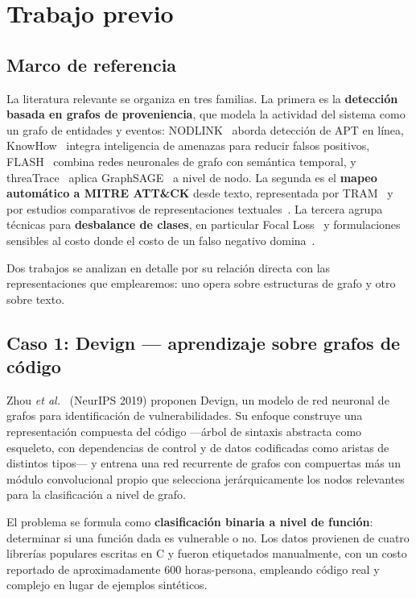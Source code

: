 \documentclass[conference]{IEEEtran}
\begin{document}
\section{Trabajo previo}
\label{sec:relacionados}

\subsection{Marco de referencia}
La literatura relevante se organiza en tres familias. La primera es la \textbf{detecci\'on basada en grafos de proveniencia}, que modela la actividad del sistema como un grafo de entidades y eventos: NODLINK~\cite{nodlink} aborda detecci\'on de APT en l\'inea, KnowHow~\cite{knowhow} integra inteligencia de amenazas para reducir falsos positivos, FLASH~\cite{flash} combina redes neuronales de grafo con sem\'antica temporal, y threaTrace~\cite{threatrace} aplica GraphSAGE~\cite{graphsage} a nivel de nodo. La segunda es el \textbf{mapeo autom\'atico a MITRE ATT\&CK} desde texto, representada por TRAM~\cite{tram} y por estudios comparativos de representaciones textuales~\cite{tfidf}. La tercera agrupa t\'ecnicas para \textbf{desbalance de clases}, en particular Focal Loss~\cite{focal} y formulaciones sensibles al costo donde el costo de un falso negativo domina~\cite{cost}.

Dos trabajos se analizan en detalle por su relaci\'on directa con las representaciones que emplearemos: uno opera sobre estructuras de grafo y otro sobre texto.

\subsection{Caso 1: Devign — aprendizaje sobre grafos de c\'odigo}
Zhou \emph{et al.}~\cite{devign} (NeurIPS 2019) proponen Devign, un modelo de red neuronal de grafos para identificaci\'on de vulnerabilidades. Su enfoque construye una representaci\'on compuesta del c\'odigo —\'arbol de sintaxis abstracta como esqueleto, con dependencias de control y de datos codificadas como aristas de distintos tipos— y entrena una red recurrente de grafos con compuertas m\'as un m\'odulo convolucional propio que selecciona jer\'arquicamente los nodos relevantes para la clasificaci\'on a nivel de grafo.

El problema se formula como \textbf{clasificaci\'on binaria a nivel de funci\'on}: determinar si una funci\'on dada es vulnerable o no. Los datos provienen de cuatro librer\'ias populares escritas en C y fueron etiquetados manualmente, con un costo reportado de aproximadamente 600 horas-persona, empleando c\'odigo real y complejo en lugar de ejemplos sint\'eticos.
\end{document}
